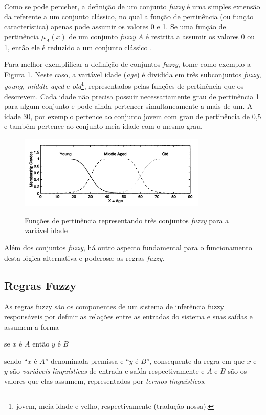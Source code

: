 Como se pode perceber, a definição de um conjunto \textit{fuzzy} é uma simples extensão da referente a um conjunto clássico, no qual a função de pertinência (ou função característica) apenas pode assumir os valores 0 e 1. Se uma função de pertinência $\mu_A(x)$ de um conjunto \textit{fuzzy} $A$ é restrita a assumir os valores 0 ou 1, então ele é reduzido a um conjunto clássico \cite[p.~14]{Jang1997}.

Para melhor exemplificar a definição de conjuntos \textit{fuzzy}, tome como exemplo a Figura \ref{fig:fuzzy_sets_jang}. Neste caso, a variável idade (\textit{age}) é dividida em três subconjuntos \textit{fuzzy}, \textit{young, middle aged} e \textit{old}\footnote{jovem, meia idade e velho, respectivamente (tradução nossa).}, representados pelas funções de pertinência que os descrevem. Cada idade não precisa possuir necessariamente grau de pertinência 1 para algum conjunto e pode ainda pertencer simultaneamente a mais de um. A idade 30, por exemplo pertence ao conjunto jovem com grau de pertinência de 0,5 e também pertence ao conjunto meia idade com o mesmo grau.

\begin{figure}[!htb]
    \centering
    \caption{Funções de pertinência representando três conjuntos \textit{fuzzy} para a variável idade}
    \includegraphics[width=0.8\textwidth]{./04-figuras/fund_teorica/fuzzy_sets_jang}
    \label{fig:fuzzy_sets_jang}
\end{figure}

Além dos conjuntos \textit{fuzzy}, há outro aspecto fundamental para o funcionamento desta lógica alternativa e poderosa: as regras \textit{fuzzy}.

\subsection{Regras Fuzzy}
\label{sec:regras_fuzzy}

As regras fuzzy são os componentes de um sistema de inferência fuzzy responsáveis por definir as relações entre as entradas do sistema e suas saídas e assumem a forma
\begin{center}
se $x$ é $A$ então $y$ é $B$
\end{center}
sendo ``$x$ é $A$'' denominada premissa  e ``$y$ é $B$'', consequente da regra em que $x$ e $y$ são \textit{variáveis linguísticas} de entrada e saída respectivamente  e $A$ e $B$ são os valores que elas assumem, representados por \textit{termos linguísticos}.


